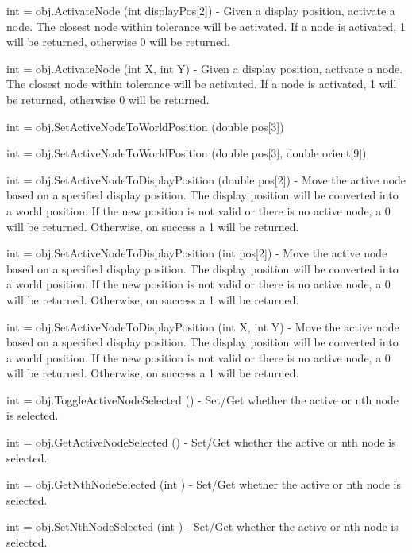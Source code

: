 \begin{DoxyItemize}
\item {\ttfamily int = obj.\-Activate\-Node (int display\-Pos\mbox{[}2\mbox{]})} -\/ Given a display position, activate a node. The closest node within tolerance will be activated. If a node is activated, 1 will be returned, otherwise 0 will be returned.  
\item {\ttfamily int = obj.\-Activate\-Node (int X, int Y)} -\/ Given a display position, activate a node. The closest node within tolerance will be activated. If a node is activated, 1 will be returned, otherwise 0 will be returned.  
\item {\ttfamily int = obj.\-Set\-Active\-Node\-To\-World\-Position (double pos\mbox{[}3\mbox{]})}  
\item {\ttfamily int = obj.\-Set\-Active\-Node\-To\-World\-Position (double pos\mbox{[}3\mbox{]}, double orient\mbox{[}9\mbox{]})}  
\item {\ttfamily int = obj.\-Set\-Active\-Node\-To\-Display\-Position (double pos\mbox{[}2\mbox{]})} -\/ Move the active node based on a specified display position. The display position will be converted into a world position. If the new position is not valid or there is no active node, a 0 will be returned. Otherwise, on success a 1 will be returned.  
\item {\ttfamily int = obj.\-Set\-Active\-Node\-To\-Display\-Position (int pos\mbox{[}2\mbox{]})} -\/ Move the active node based on a specified display position. The display position will be converted into a world position. If the new position is not valid or there is no active node, a 0 will be returned. Otherwise, on success a 1 will be returned.  
\item {\ttfamily int = obj.\-Set\-Active\-Node\-To\-Display\-Position (int X, int Y)} -\/ Move the active node based on a specified display position. The display position will be converted into a world position. If the new position is not valid or there is no active node, a 0 will be returned. Otherwise, on success a 1 will be returned.  
\item {\ttfamily int = obj.\-Toggle\-Active\-Node\-Selected ()} -\/ Set/\-Get whether the active or nth node is selected.  
\item {\ttfamily int = obj.\-Get\-Active\-Node\-Selected ()} -\/ Set/\-Get whether the active or nth node is selected.  
\item {\ttfamily int = obj.\-Get\-Nth\-Node\-Selected (int )} -\/ Set/\-Get whether the active or nth node is selected.  
\item {\ttfamily int = obj.\-Set\-Nth\-Node\-Selected (int )} -\/ Set/\-Get whether the active or nth node is selected.  

\end{DoxyItemize}

